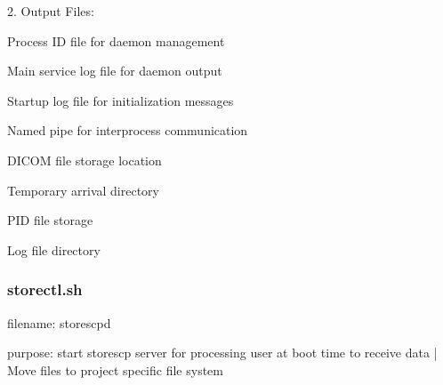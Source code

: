 \documentclass[letterpaper,10pt,english]{sphinxmanual}
\begin{document}
\begin{DUlineblock}{0em}
\item[] 2. Output Files:
\end{DUlineblock}

\begin{DUlineblock}{0em}
\item[] \sphinxhyphen{}  \sphinxhyphen{} Process ID file for daemon management
\item[] \sphinxhyphen{}  \sphinxhyphen{} Main service log file for daemon output
\item[] \sphinxhyphen{}  \sphinxhyphen{} Startup log file for initialization messages
\item[] \sphinxhyphen{}  \sphinxhyphen{} Named pipe for inter\sphinxhyphen{}process communication
\end{DUlineblock}

\sphinxAtStartPar
{}

\begin{DUlineblock}{0em}
\item[] \sphinxhyphen{}  \sphinxhyphen{} DICOM file storage location
\item[] \sphinxhyphen{}  \sphinxhyphen{} Temporary arrival directory
\item[] \sphinxhyphen{}  \sphinxhyphen{} PID file storage
\item[] \sphinxhyphen{}  \sphinxhyphen{} Log file directory
\end{DUlineblock}


\subsubsection{storectl.sh}
\label{\detokenize{Architecture/scripts/storectl:id1}}
\sphinxAtStartPar
filename: storescpd

\sphinxAtStartPar
purpose: start storescp server for processing user at boot time to receive data
|         Move files to project specific file system
\end{document}

